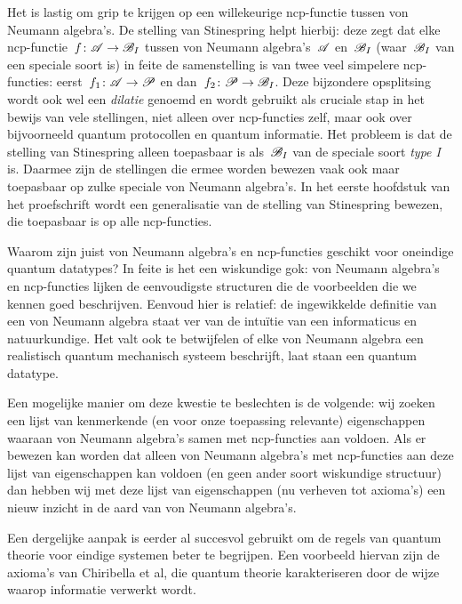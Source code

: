 Het is lastig om grip te krijgen
    op een willekeurige ncp-functie
    tussen von Neumann algebra's.
De stelling van Stinespring helpt hierbij:
    deze zegt dat elke ncp-functie~$f\colon \mathscr{A} \to \mathscr{B}_I$
    tussen von Neumann algebra's~$\mathscr{A}$ en~$\mathscr{B}_I$
        (waar~$\mathscr{B}_I$ van een speciale soort is)
        in feite de samenstelling is
        van twee veel simpelere ncp-functies:
        eerst~$f_1\colon \mathscr{A} \to \mathscr{P}$
            en dan~$f_2\colon \mathscr{P} \to \mathscr{B}_I$.
    Deze bijzondere opsplitsing wordt
        ook wel een \emph{dilatie} genoemd
            en wordt gebruikt als cruciale stap in het
    bewijs van vele stellingen, niet alleen over ncp-functies zelf,
    maar ook over bijvoorneeld quantum protocollen en quantum informatie.
Het probleem is dat de stelling van Stinespring alleen toepasbaar
    is als~$\mathscr{B}_I$ van de speciale soort \emph{type I} is.
Daarmee zijn de stellingen die ermee worden bewezen vaak ook maar toepasbaar
    op zulke speciale von Neumann algebra's.
In het eerste hoofdstuk van het proefschrift
    wordt een generalisatie van de stelling van Stinespring
    bewezen, die toepasbaar is op alle ncp-functies.

Waarom zijn juist von Neumann algebra's en ncp-functies
    geschikt voor oneindige quantum datatypes?
In feite is het een wiskundige gok:
    von Neumann algebra's en ncp-functies
    lijken de eenvoudigste structuren die
    de voorbeelden die we kennen goed beschrijven.
Eenvoud hier is relatief: de ingewikkelde definitie
    van een von Neumann algebra
    staat ver van de intu\"itie van een
    informaticus en natuurkundige.
Het valt ook te betwijfelen of elke von Neumann
    algebra een realistisch quantum mechanisch systeem beschrijft,
    laat staan een quantum datatype.

Een mogelijke manier om deze kwestie te beslechten is de volgende:
    wij zoeken een lijst van kenmerkende
    (en voor onze toepassing relevante) eigenschappen waaraan
        von Neumann algebra's samen met ncp-functies aan voldoen.
Als er bewezen kan worden dat alleen von Neumann algebra's
    met ncp-functies aan deze lijst van eigenschappen kan voldoen
    (en geen ander soort wiskundige structuur)
    dan hebben wij met deze lijst van eigenschappen
        (nu verheven tot axioma's)
    een nieuw inzicht in de aard van von Neumann algebra's.

Een dergelijke aanpak is eerder al succesvol gebruikt
    om de regels van quantum theorie voor eindige systemen beter te begrijpen.
Een voorbeeld hiervan zijn de axioma's van Chiribella et al,
    die quantum theorie karakteriseren door
    de wijze waarop informatie verwerkt wordt.


